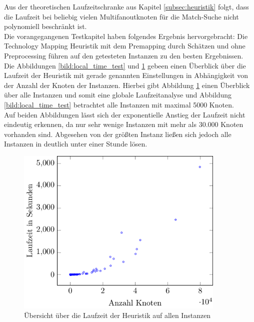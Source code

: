 \documentclass[11pt, a4paper, german]{article}
\newcommand{\TM}{Technology  Mapping }
\begin{document}
Aus der theoretischen Laufzeitschranke aus Kapitel \ref{subsec:heuristik} folgt, dass die Laufzeit bei beliebig vielen Multifanoutknoten f\"ur die Match-Suche nicht polynomiell beschr\"ankt ist. \\
Die vorangegangenen Testkapitel haben folgendes Ergebnis hervorgebracht: Die \TM Heuristik mit dem Premapping durch Sch\"atzen und ohne Preprocessing f\"uhren auf den getesteten Instanzen zu den besten Ergebnissen. \\
Die Abbildungen \ref{bild:local_time_test} und \ref{bild:global_time_test} gebeen einen \"Uberblick \"uber die Laufzeit der Heuristik mit gerade genannten Einstellungen in Abh\"angigkeit von der Anzahl der Knoten der Instanzen. 
Hierbei gibt Abbildung \ref{bild:global_time_test} einen \"Uberblick \"uber alle Instanzen und somit eine globale Laufzeitanalyse und Abbildung \ref{bild:local_time_test} betrachtet alle Instanzen mit maximal 5000 Knoten.\\
Auf beiden Abbildungen l\"asst sich der exponentielle Anstieg der Laufzeit nicht eindeutig erkennen, da nur sehr wenige Instanzen mit mehr als 30.000 Knoten vorhanden sind. Abgesehen von der gr\"o{\ss}ten Instanz lie{\ss}en sich jedoch alle Instanzen in deutlich unter einer Stunde l\"osen.
\begin{figure}[h]
		\centering
		\includegraphics[width = 10cm]{pictures/tex_files/analysis/time_test}
		\caption{\"Ubersicht \"uber die Laufzeit der Heuristik auf allen Instanzen}
		\label{bild:global_time_test}
\end{figure}
\end{document}
